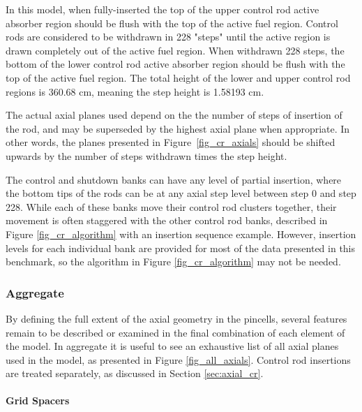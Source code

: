 In this model, when fully-inserted the top of the upper control rod active
absorber region should be flush with the top of the active fuel region. Control
rods are considered to be withdrawn in 228 "steps" until the active region is
drawn completely out of the active fuel region. When withdrawn 228 steps, the
bottom of the lower control rod active absorber region should be flush with the
top of the active fuel region. The total height of the lower and upper control
rod regions is 360.68 cm, meaning the step height is 1.58193 cm.

The actual axial planes used depend on the the number of steps of insertion of
the rod, and may be superseded by the highest axial plane when appropriate. In
other words, the planes presented in Figure~\ref{fig_cr_axials} should be
shifted upwards by the number of steps withdrawn times the step height.

The control and shutdown banks can have any level of partial insertion, where
the bottom tips of the rods can be at any axial step level between step 0 and
step 228. While each of these banks move their control rod clusters together,
their movement is often staggered with the other control rod banks, described in
Figure \ref{fig_cr_algorithm} with an insertion sequence example. However,
insertion levels for each individual bank are provided for most of the data
presented in this benchmark, so the algorithm in Figure \ref{fig_cr_algorithm}
may not be needed.




\subsubsection{Aggregate}

By defining the full extent of the axial geometry in the pincells, several
features remain to be described or examined in the final combination of each
element of the model. In aggregate it is useful to see an exhaustive list of
all axial planes used in the model, as presented in Figure \ref{fig_all_axials}.
Control rod insertions are treated separately, as discussed in Section
\ref{sec:axial_cr}.


\paragraph{Grid Spacers}

